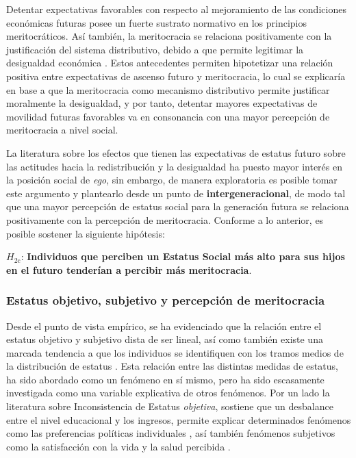 \documentclass[12pt]{article}
\begin{document}
Detentar expectativas favorables con respecto al mejoramiento de las condiciones económicas futuras posee un fuerte sustrato normativo en los principios meritocráticos. Así también, la meritocracia se relaciona positivamente con la justificación del sistema distributivo, debido a que permite legitimar la desigualdad económica \citep{Day2017}. Estos antecedentes permiten hipotetizar una relación positiva entre expectativas de ascenso futuro y meritocracia, lo cual se explicaría en base a que la meritocracia como mecanismo distributivo permite justificar moralmente la desigualdad, y por tanto, detentar mayores expectativas de movilidad futuras favorables va en consonancia con una mayor percepción de meritocracia a nivel social. 

La literatura sobre los efectos que tienen las expectativas de estatus futuro sobre las actitudes hacia la redistribución y la desigualdad ha puesto mayor interés en la posición social de \emph{ego}, sin embargo, de manera exploratoria es posible tomar este argumento y plantearlo desde un punto de \textbf{intergeneracional}, de modo tal que una mayor percepción de estatus social para la generación futura se relaciona positivamente con la percepción de meritocracia. Conforme a lo anterior, es posible sostener la siguiente hipótesis:

$H_{\text{2c}}$: \textbf{Individuos que perciben un Estatus Social más alto para sus hijos en el futuro tenderían a percibir más meritocracia}.

\subsubsection*{Estatus objetivo, subjetivo y percepción de meritocracia}

 
Desde el punto de vista empírico, se ha evidenciado que la relación entre el estatus objetivo y subjetivo dista de ser lineal, así como también existe una marcada tendencia a que los individuos se identifiquen con los tramos medios de la distribución de estatus \citep{Andersson2018a,Castillo2013}. Esta relación entre las distintas medidas de estatus, ha sido abordado como un fenómeno en sí mismo, pero ha sido escasamente investigada como una variable explicativa de otros fenómenos. Por un lado la literatura sobre Inconsistencia de Estatus \emph{objetiva}, sostiene que un desbalance entre el nivel educacional y los ingresos, permite explicar determinados fenómenos como las preferencias políticas individuales \citep{Lenski1967,Varas2015}, así también fenómenos subjetivos como la satisfacción con la vida y la salud percibida \citep{Zhang2008, Andersson2018}. 
   
\end{document}

